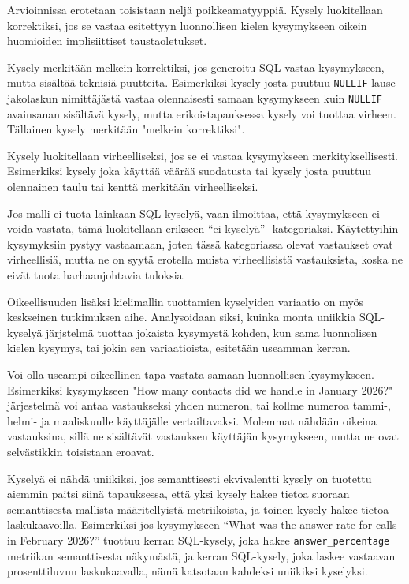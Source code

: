 Arvioinnissa erotetaan toisistaan neljä poikkeamatyyppiä. Kysely luokitellaan korrektiksi, jos se vastaa esitettyyn luonnollisen kielen kysymykseen oikein huomioiden implisiittiset taustaoletukset.

Kysely merkitään melkein korrektiksi, jos generoitu SQL vastaa kysymykseen, mutta sisältää teknisiä puutteita. Esimerkiksi kysely josta puuttuu \texttt{NULLIF} lause jakolaskun nimittäjästä vastaa olennaisesti samaan kysymykseen kuin \texttt{NULLIF} avainsanan sisältävä kysely, mutta erikoistapauksessa kysely voi tuottaa virheen. Tällainen kysely merkitään "melkein korrektiksi".

Kysely luokitellaan virheelliseksi, jos se ei vastaa kysymykseen merkityksellisesti. Esimerkiksi kysely joka käyttää väärää suodatusta tai kysely josta puuttuu olennainen taulu tai kenttä merkitään virheelliseksi.

Jos malli ei tuota lainkaan SQL-kyselyä, vaan ilmoittaa, että kysymykseen ei voida vastata, tämä luokitellaan erikseen ``ei kyselyä'' -kategoriaksi. Käytettyihin kysymyksiin pystyy vastaamaan, joten tässä kategoriassa olevat vastaukset ovat virheellisiä, mutta ne on syytä erotella muista virheellisistä vastauksista, koska ne eivät tuota harhaanjohtavia tuloksia.

Oikeellisuuden lisäksi kielimallin tuottamien kyselyiden variaatio on myös keskseinen tutkimuksen aihe. Analysoidaan siksi, kuinka monta uniikkia SQL-kyselyä järjstelmä tuottaa jokaista kysymystä kohden, kun sama luonnolisen kielen kysymys, tai jokin sen variaatioista, esitetään useamman kerran.

Voi olla useampi oikeellinen tapa vastata samaan luonnollisen kysymykseen. Esimerkiksi kysymykseen "How many contacts did we handle in January 2026?" järjestelmä voi antaa vastaukseksi yhden numeron, tai kollme numeroa tammi-, helmi- ja maaliskuulle käyttäjälle vertailtavaksi. Molemmat nähdään oikeina vastauksina, sillä ne sisältävät vastauksen käyttäjän kysymykseen, mutta ne ovat selvästikkin toisistaan eroavat.

Kyselyä ei nähdä uniikiksi, jos semanttisesti ekvivalentti kysely on tuotettu aiemmin paitsi siinä tapauksessa, että yksi kysely hakee tietoa suoraan semanttisesta mallista määritellyistä metriikoista, ja toinen kysely hakee tietoa laskukaavoilla. Esimerkiksi jos kysymykseen ``What was the answer rate for calls in February 2026?'' tuottuu kerran SQL-kysely, joka hakee \texttt{answer\_percentage} metriikan semanttisesta näkymästä, ja kerran SQL-kysely, joka laskee vastaavan prosenttiluvun laskukaavalla, nämä katsotaan kahdeksi uniikiksi kyselyksi.

